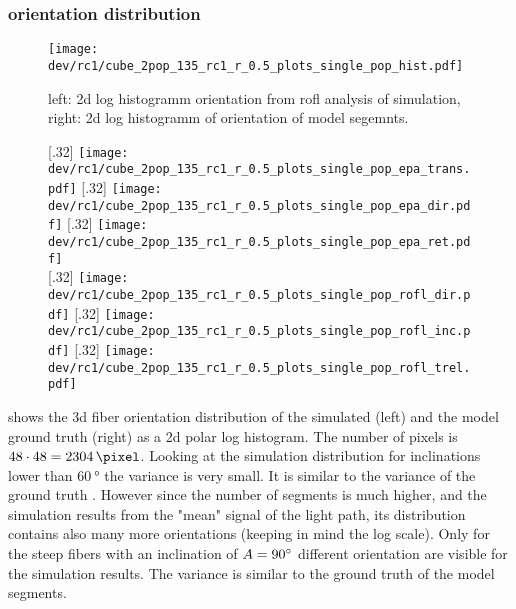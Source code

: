 \subsubsection{orientation distribution}
% 
\begin{figure}[!tp]
\centering
\texttt{[image: dev/rc1/cube\_2pop\_135\_rc1\_r\_0.5\_plots\_single\_pop\_hist.pdf]} 
\caption[sim]{left: 2d log histogramm orientation from rofl analysis of simulation, right: 2d log histogramm of orientation of model segemnts. }
\label{fig:single_fiber_pop_hist}
\end{figure}
% 
% 
% 
\begin{figure}[!tp]
\centering
{}[.32\textwidth]{
\texttt{[image: dev/rc1/cube\_2pop\_135\_rc1\_r\_0.5\_plots\_single\_pop\_epa\_trans.pdf]}}\hfill
{}[.32\textwidth]{
\texttt{[image: dev/rc1/cube\_2pop\_135\_rc1\_r\_0.5\_plots\_single\_pop\_epa\_dir.pdf]}}\hfill
{}[.32\textwidth]{
\texttt{[image: dev/rc1/cube\_2pop\_135\_rc1\_r\_0.5\_plots\_single\_pop\_epa\_ret.pdf]}}
\\[2em]
[.32\textwidth]{
\texttt{[image: dev/rc1/cube\_2pop\_135\_rc1\_r\_0.5\_plots\_single\_pop\_rofl\_dir.pdf]}}\hfill
{}[.32\textwidth]{
\texttt{[image: dev/rc1/cube\_2pop\_135\_rc1\_r\_0.5\_plots\_single\_pop\_rofl\_inc.pdf]}}\hfill
{}[.32\textwidth]{
\texttt{[image: dev/rc1/cube\_2pop\_135\_rc1\_r\_0.5\_plots\_single\_pop\_rofl\_trel.pdf]}}
\caption[]{}
\label{fig:single_fiber_pop_rofl}
\end{figure}
% 
 shows the 3d fiber orientation distribution of the simulated (left) and the model ground truth (right) as a 2d polar log histogram.
The number of pixels is $48\cdot48=\SI{2304}{\pixel}$.
Looking at the simulation distribution for inclinations lower than $\SI{60}{\degree}$ the variance is very small.
It is similar to the variance of the ground truth .
However since the number of segments is much higher, and the simulation results from the "mean" signal of the light path, its distribution contains also many more orientations (keeping in mind the log scale).
Only for the steep fibers with an inclination of $\textnormal{$A$}{}=\SI{90}{\degree}$ different orientation are visible for the simulation results.
The variance is similar to the ground truth of the model segments.
% 
% 
